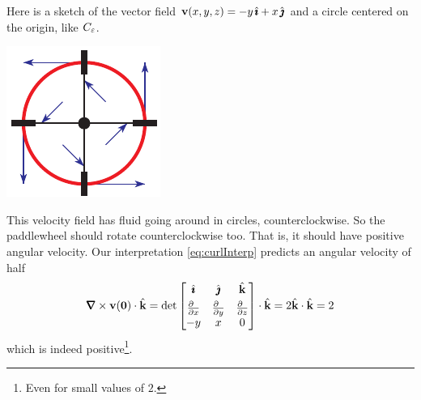 \begin{eg}\label{eg:curlInterpB}
Here is a sketch of the vector field $\mathbf{v}(x,y,z) = -y\,\hat{\pmb{\imath}}+x\,\hat{\pmb{\jmath}}$
and a circle centered on the origin, like $C_\varepsilon$. 
\begin{nfig}
\begin{center}
    \includegraphics{vortexCurl.pdf}
\end{center}
\end{nfig}
This velocity field has fluid going around in circles, counterclockwise.
So the paddlewheel should rotate counterclockwise too. That is, it should
have positive angular velocity.
Our interpretation \eqref{eq:curlInterp} predicts an angular velocity of half
\begin{align*}
\vnabla\times\vv(\vZero)\cdot\hk =
\det\left[\begin{matrix}
          \hi & \hj &\hk \\[0.05in]
          \frac{\partial\hfill}{\partial x} &
              \frac{\partial\hfill}{\partial y} &
              \frac{\partial\hfill}{\partial z}  \\
           -y & x & 0
          \end{matrix}
     \right] \cdot\hk
=2\hk\cdot\hk
=2
\end{align*}
which is indeed positive\footnote{Even for small values of $2$.}.
\end{eg}



